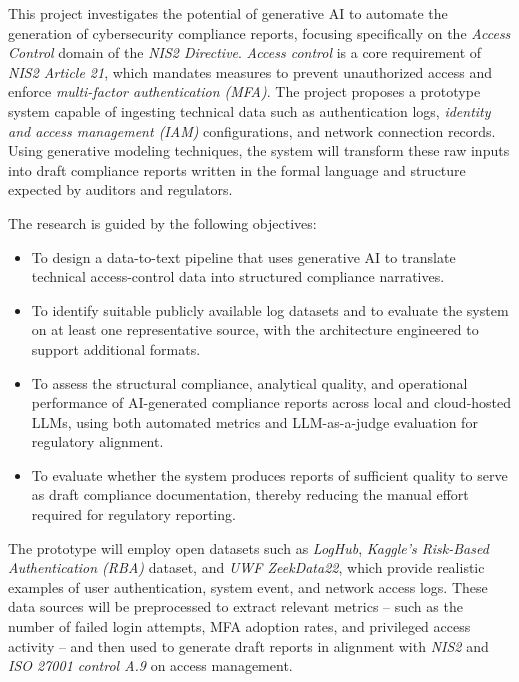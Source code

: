 \documentclass[]{UCD_CS_FYP_Report}
\begin{document}
This project investigates the potential of generative AI to automate the generation of cybersecurity compliance reports, focusing specifically on the \textit{Access Control} domain of the \textit{NIS2 Directive}. \textit{Access control} is a core requirement of \textit{NIS2 Article 21}, which mandates measures to prevent unauthorized access and enforce \textit{multi-factor authentication (MFA)}. The project proposes a prototype system capable of ingesting technical data such as authentication logs, \textit{identity and access management (IAM)} configurations, and network connection records. Using generative modeling techniques, the system will transform these raw inputs into draft compliance reports written in the formal language and structure expected by auditors and regulators.

The research is guided by the following objectives:

\begin{itemize}
    \item To design a data-to-text pipeline that uses generative AI to translate technical access-control data into structured compliance narratives.
    \item To identify suitable publicly available log datasets and to evaluate the system on at least one representative source, with the architecture engineered to support additional formats.
    \item To assess the structural compliance, analytical quality, and operational performance of AI-generated compliance reports across local and cloud-hosted LLMs, using both automated metrics and LLM-as-a-judge evaluation for regulatory alignment.
    \item To evaluate whether the system produces reports of sufficient quality to serve as draft compliance documentation, thereby reducing the manual effort required for regulatory reporting.
\end{itemize}

The prototype will employ open datasets such as \textit{LogHub}\cite{Zhu2023Loghub}, \textit{Kaggle's Risk-Based Authentication (RBA)}\cite{KaggleRBA2023} dataset, and \textit{UWF ZeekData22}\cite{Bagui2023UWFZeekData22}, which provide realistic examples of user authentication, system event, and network access logs. These data sources will be preprocessed to extract relevant metrics -- such as the number of failed login attempts, MFA adoption rates, and privileged access activity -- and then used to generate draft reports in alignment with \textit{NIS2}\cite{NIS2Directive2023} and \textit{ISO 27001 control A.9}\cite{ISO27001A9} on access management.
\end{document}
